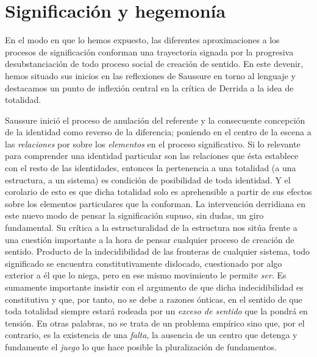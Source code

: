 \hypertarget{significaciuxf3n-y-hegemonuxeda}{%
\section{Significación y hegemonía}\label{significaciuxf3n-y-hegemonuxeda}}

En el modo en que lo hemos expuesto, las diferentes aproximaciones a los
procesos de significación conforman una trayectoria signada por la
progresiva desubstanciación de todo proceso social de creación de
sentido. En este devenir, hemos situado sus inicios en las reflexiones
de Saussure en torno al lenguaje y destacamos un punto de inflexión
central en la crítica de Derrida a la idea de totalidad.

Saussure inició el proceso de anulación del referente y la consecuente
concepción de la identidad como reverso de la diferencia; poniendo en el
centro de la escena a las \emph{relaciones} por sobre los
\emph{elementos} en el proceso significativo. Si lo relevante para
comprender una identidad particular son las relaciones que ésta
establece con el resto de las identidades, entonces la pertenencia a una
totalidad (a una estructura, a un sistema) es condición de posibilidad
de toda identidad. Y el corolario de esto es que dicha totalidad solo es
aprehensible a partir de sus efectos sobre los elementos particulares
que la conforman. La intervención derridiana en este nuevo modo de
pensar la significación supuso, sin dudas, un giro fundamental. Su
crítica a la estructuralidad de la estructura nos sitúa frente a una
cuestión importante a la hora de pensar cualquier proceso de creación de
sentido. Producto de la indecidibilidad de las fronteras de cualquier
sistema, todo significado se encuentra constitutivamente dislocado,
cuestionado por algo exterior a él que lo niega, pero en ese mismo
movimiento le permite \emph{ser}. Es sumamente importante insistir con
el argumento de que dicha indecidibilidad es constitutiva y que, por
tanto, no se debe a razones ónticas, en el sentido de que toda totalidad
siempre estará rodeada por un \emph{exceso de sentido} que la pondrá en
tensión. En otras palabras, no se trata de un problema empírico sino
que, por el contrario, es la existencia de una \emph{falta}, la ausencia
de un centro que detenga y fundamente el \emph{juego} lo que hace
posible la pluralización de fundamentos.

